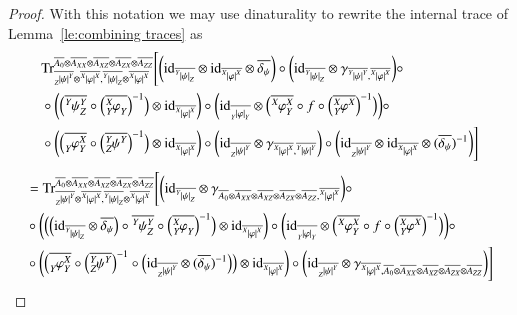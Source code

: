 \documentclass{amsart}
\def\tn{\textnormal}
\def\Trace{\tn{Tr}}
\def\ol{\overline}
\def\id{\tn{id}}
\newcommand{\feeddd}[3]{{\tensor*[^{#2}_{\color{white}{!}}]{{|#1|}}{^{#3}}}}%
\newcommand{\feeddc}[3]{{\tensor*[^{#2}]{{|#1|}}{_{#3}}}}
\newcommand{\feedcd}[3]{{\tensor*[_{#2}]{{|#1|}}{^{#3}}}}
\newcommand{\feedcc}[3]{{\tensor*[^{\color{white}{!}}_{#2}]{{|#1|}}{_{#3}}}}
\newcommand{\feedda}[3]{{\tensor*[^{#2}_{\color{white}{!}}]{{#1}}{^{#2}_{#3}}}}
\newcommand{\feedca}[3]{{\tensor*[_{#2}]{{#1}}{_{#2}^{#3}}}}
\newcommand{\feedad}[3]{{\tensor*[^{#2}_{#3}]{{#1}}{^{#2}}}}
\newcommand{\feedac}[3]{{\tensor*[_{#2}^{#3}]{{#1}}{_{#2}}}}
\theoremstyle{remark}
\theoremstyle{definition}
\begin{document}
\begin{proof}
With this notation we may use dinaturality to rewrite the internal trace of Lemma~\ref{le:combining traces} as
\begin{align*}
&\Trace^{\ol{A_0}\otimes\ol{A_{XX}}\otimes\ol{A_{XZ}}\otimes\ol{A_{ZX}}\otimes\ol{A_{ZZ}}}_{\ol{\feedcd{\psi}{Z}{Y}}\otimes\ol{\feeddd{\varphi}{X}{X}},\ol{\feeddc{\psi}{Y}{Z}}\otimes\ol{\feeddd{\varphi}{X}{X}}}\Bigg[\bigg(\id_{\ol{\feeddc{\psi}{Y}{Z}}}\otimes\id_{\ol{\feeddd{\varphi}{X}{X}}}\otimes\ol{\delta_\psi}\bigg)\circ
\bigg(\id_{\ol{\feeddc{\psi}{Y}{Z}}}\otimes\gamma_{\ol{\feeddd{\psi}{Y}{Y}},\ol{\feeddd{\varphi}{X}{X}}}\bigg)\circ\\
&\circ\bigg(\Big(\ol{\feedda{\psi}{Y}{Z}}\circ\Big(\ol{\feedac{\varphi}{Y}{X}}\Big)^{-1}\Big)\otimes\id_{\ol{\feeddd{\varphi}{X}{X}}}\bigg)\circ\bigg(\id_{\ol{\feedcc{\varphi}{Y}{Y}}}\otimes\Big(\ol{\feedda{\varphi}{X}{Y}}\circ f\circ\Big(\ol{\feedad{\varphi}{X}{Y}}\Big)^{-1}\Big)\bigg)\circ\\
&\circ\bigg(\Big(\ol{\feedca{\varphi}{Y}{X}}\circ\Big(\ol{\feedad{\psi}{Y}{Z}}\Big)^{-1}\Big)\otimes\id_{\ol{\feeddd{\varphi}{X}{X}}}\bigg)\circ\bigg(\id_{\ol{\feedcd{\psi}{Z}{Y}}}\otimes\gamma_{\ol{\feeddd{\varphi}{X}{X}},\ol{\feeddd{\psi}{Y}{Y}}}\bigg)\circ\bigg(\id_{\ol{\feedcd{\psi}{Z}{Y}}}\otimes\id_{\ol{\feeddd{\varphi}{X}{X}}}\otimes(\ol{\delta_\psi})^{-1}\bigg)\Bigg]\\
\end{align*}
\begin{align*}
&=\Trace^{\ol{A_0}\otimes\ol{A_{XX}}\otimes\ol{A_{XZ}}\otimes\ol{A_{ZX}}\otimes\ol{A_{ZZ}}}_{\ol{\feedcd{\psi}{Z}{Y}}\otimes\ol{\feeddd{\varphi}{X}{X}},\ol{\feeddc{\psi}{Y}{Z}}\otimes\ol{\feeddd{\varphi}{X}{X}}}\Bigg[
\bigg(\id_{\ol{\feeddc{\psi}{Y}{Z}}}\otimes\gamma_{\ol{A_0}\otimes\ol{A_{XX}}\otimes\ol{A_{XZ}}\otimes\ol{A_{ZX}}\otimes\ol{A_{ZZ}},\ol{\feeddd{\varphi}{X}{X}}}\bigg)\circ\\
&\circ\bigg(\Big(\Big(\id_{\ol{\feeddc{\psi}{Y}{Z}}}\otimes\ol{\delta_\psi}\Big)\circ\ol{\feedda{\psi}{Y}{Z}}\circ\Big(\ol{\feedac{\varphi}{Y}{X}}\Big)^{-1}\Big)\otimes\id_{\ol{\feeddd{\varphi}{X}{X}}}\bigg)\circ\bigg(\id_{\ol{\feedcc{\varphi}{Y}{Y}}}\otimes\Big(\ol{\feedda{\varphi}{X}{Y}}\circ f\circ\Big(\ol{\feedad{\varphi}{X}{Y}}\Big)^{-1}\Big)\bigg)\circ\\
&\circ\bigg(\Big(\ol{\feedca{\varphi}{Y}{X}}\circ\Big(\ol{\feedad{\psi}{Y}{Z}}\Big)^{-1}\circ\Big(\id_{\ol{\feedcd{\psi}{Z}{Y}}}\otimes(\ol{\delta_\psi})^{-1}\Big)\Big)\otimes\id_{\ol{\feeddd{\varphi}{X}{X}}}\bigg)\circ\bigg(\id_{\ol{\feedcd{\psi}{Z}{Y}}}\otimes\gamma_{\ol{\feeddd{\varphi}{X}{X}},\ol{A_0}\otimes\ol{A_{XX}}\otimes\ol{A_{XZ}}\otimes\ol{A_{ZX}}\otimes\ol{A_{ZZ}}}\bigg)\Bigg]

\end{align*}
\end{proof}
\end{document}
